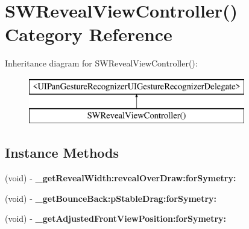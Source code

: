 \hypertarget{category_s_w_reveal_view_controller_07_08}{}\section{S\+W\+Reveal\+View\+Controller() Category Reference}
\label{category_s_w_reveal_view_controller_07_08}
Inheritance diagram for S\+W\+Reveal\+View\+Controller()\+:\begin{figure}[H]
\begin{center}
\leavevmode
\includegraphics[height=2.000000cm]{category_s_w_reveal_view_controller_07_08}
\end{center}
\end{figure}
\subsection*{Instance Methods}
\begin{DoxyCompactItemize}
\item 
\mbox{\label{category_s_w_reveal_view_controller_07_08_abd0741a8f22739855e7c3645efce70ec}} 
(void) -\/ {\bfseries \+\_\+get\+Reveal\+Width\+:reveal\+Over\+Draw\+:for\+Symetry\+:}
\item 
\mbox{\label{category_s_w_reveal_view_controller_07_08_affcb48754c6905b7462d428ed6eb9a08}} 
(void) -\/ {\bfseries \+\_\+get\+Bounce\+Back\+:p\+Stable\+Drag\+:for\+Symetry\+:}
\item 
\mbox{\label{category_s_w_reveal_view_controller_07_08_a502042d282f0e6db1ebcc745d88a1570}} 
(void) -\/ {\bfseries \+\_\+get\+Adjusted\+Front\+View\+Position\+:for\+Symetry\+:}
\end{DoxyCompactItemize}
